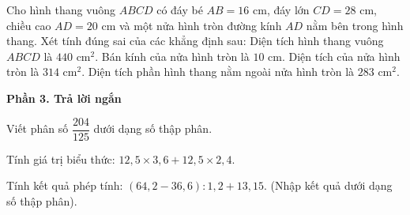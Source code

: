 \begin{ex} %
Cho hình thang vuông $ABCD$ có đáy bé $AB = 16\text{ cm}$, đáy lớn $CD = 28\text{ cm}$, chiều cao $AD = 20\text{ cm}$ và một nửa hình tròn đường kính $AD$ nằm bên trong hình thang. Xét tính đúng sai của các khẳng định sau:
\choiceTF
{\True Diện tích hình thang vuông $ABCD$ là $440\text{ cm}^2$.}
{\True Bán kính của nửa hình tròn là $10\text{ cm}$.}
{Diện tích của nửa hình tròn là $314\text{ cm}^2$.}
{\True Diện tích phần hình thang nằm ngoài nửa hình tròn là $283\text{ cm}^2$.}
\end{ex}

\textbf{Phần 3. Trả lời ngắn}

\begin{ex} %
Viết phân số $\dfrac{204}{125}$ dưới dạng số thập phân.
\end{ex}

\begin{ex} %
Tính giá trị biểu thức: $12{,}5 \times 3{,}6 + 12{,}5 \times 2{,}4$.
\end{ex}

\begin{ex} %
Tính kết quả phép tính: $(64{,}2 - 36{,}6) : 1{,}2 + 13{,}15$. (Nhập kết quả dưới dạng số thập phân).
\end{ex}

